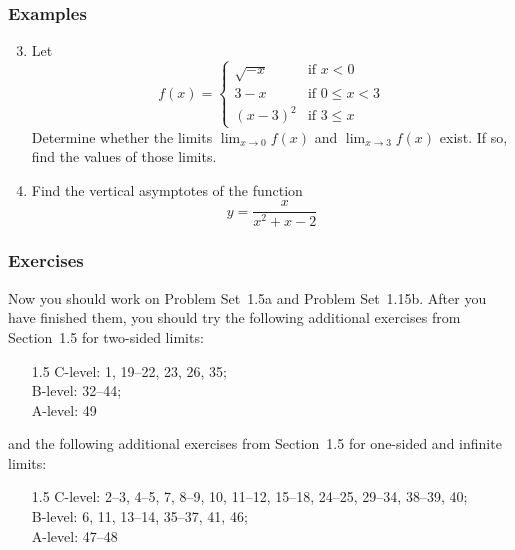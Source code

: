 \documentclass[serif,ignorenonframetext]{beamer}
\begin{document}
\begin{frame}
  \frametitle{Examples}
  \begin{enumerate}
    \setcounter{enumi}{2}
  \item Let
    \begin{displaymath}
      f(x) = \begin{cases}
        \sqrt{-x} & \mbox{if $x<0$} \\
	3-x       & \mbox{if $0\le x<3$} \\
	(x-3)^2   & \mbox{if $3\le x$}
      \end{cases}
    \end{displaymath}
    Determine whether the limits $\displaystyle\lim_{x\to 0} f(x)$ and
    $\displaystyle\lim_{x\to 3} f(x)$ exist.  If so, find the values
    of those limits.
  \item Find the vertical asymptotes of the function 
    \begin{displaymath}
      y = \frac{x}{x^2+x-2}
    \end{displaymath}
  \end{enumerate} 
\end{frame}

\begin{frame}
  \frametitle{Exercises} Now you should work on Problem Set~1.5a and
  Problem Set~1.15b.  After you have finished them, you should try the
  following additional exercises from Section~1.5 for two-sided limits:
  \begin{itemize}
  \item[1.5] 
    C-level: 1, 19--22, 23, 26, 35; \\
    B-level: 32--44; \\
    A-level: 49
  \end{itemize}
  and the following additional exercises from Section~1.5 for
  one-sided and infinite limits:
  \begin{itemize}
  \item[1.5] C-level: 2--3, 4--5, 7, 8--9, 10, 11--12, 15--18, 24--25,
    29--34, 38--39, 40; \\
    B-level: 6, 11, 13--14, 35--37, 41, 46; \\
    A-level: 47--48
  \end{itemize}
\end{frame}
\end{document}
